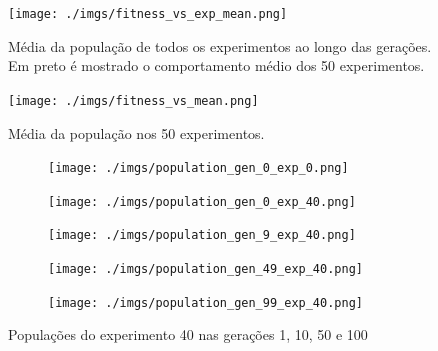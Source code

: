 \documentclass[12pt]{article}
\begin{document}
\begin{figure}[htb]
	\centering
	\texttt{[image: ./imgs/fitness\_vs\_exp\_mean.png]}
	\caption{Média da população de todos os experimentos ao longo das gerações.
	Em preto é mostrado o comportamento médio dos 50 experimentos.}
\end{figure}

\begin{figure}[htb]
	\centering
	\texttt{[image: ./imgs/fitness\_vs\_mean.png]}
	\caption{Média da população nos 50 experimentos.}
\end{figure}

	\begin{figure}[htb]
	\begin{subfigure}{.5\textwidth}
		\centering
		\texttt{[image: ./imgs/population\_gen\_0\_exp\_0.png]}
	  \end{subfigure}
	  \begin{subfigure}{.5\textwidth}
		\centering
		\texttt{[image: ./imgs/population\_gen\_0\_exp\_40.png]}
	  \end{subfigure}
	  \begin{subfigure}{.5\textwidth}
		\centering
		\texttt{[image: ./imgs/population\_gen\_9\_exp\_40.png]}
	  \end{subfigure}
	  \begin{subfigure}{.5\textwidth}
		\centering
		\texttt{[image: ./imgs/population\_gen\_49\_exp\_40.png]}
	  \end{subfigure}
	  \begin{subfigure}{.5\textwidth}
		\centering
		\texttt{[image: ./imgs/population\_gen\_99\_exp\_40.png]}
	  \end{subfigure}
	\caption{Populações do experimento 40 nas gerações 1, 10, 50 e 100}
	\end{figure}
\end{document}
